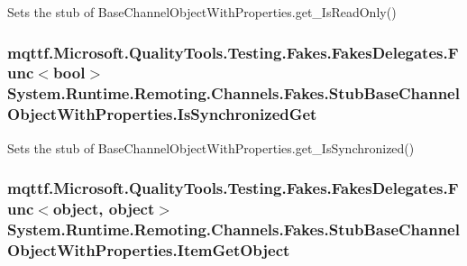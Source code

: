 Sets the stub of Base\-Channel\-Object\-With\-Properties.\-get\-\_\-\-Is\-Read\-Only()

\hypertarget{class_system_1_1_runtime_1_1_remoting_1_1_channels_1_1_fakes_1_1_stub_base_channel_object_with_properties_a45b4804380578cec24c8b7eb50a9d858}{
\subsubsection[{Is\-Synchronized\-Get}]{\setlength{\rightskip}{0pt plus 5cm}mqttf.\-Microsoft.\-Quality\-Tools.\-Testing.\-Fakes.\-Fakes\-Delegates.\-Func$<$bool$>$ System.\-Runtime.\-Remoting.\-Channels.\-Fakes.\-Stub\-Base\-Channel\-Object\-With\-Properties.\-Is\-Synchronized\-Get}}\label{class_system_1_1_runtime_1_1_remoting_1_1_channels_1_1_fakes_1_1_stub_base_channel_object_with_properties_a45b4804380578cec24c8b7eb50a9d858}


Sets the stub of Base\-Channel\-Object\-With\-Properties.\-get\-\_\-\-Is\-Synchronized()

\hypertarget{class_system_1_1_runtime_1_1_remoting_1_1_channels_1_1_fakes_1_1_stub_base_channel_object_with_properties_a8202575b4bab5eac37741c5c308e252a}{
\subsubsection[{Item\-Get\-Object}]{\setlength{\rightskip}{0pt plus 5cm}mqttf.\-Microsoft.\-Quality\-Tools.\-Testing.\-Fakes.\-Fakes\-Delegates.\-Func$<$object, object$>$ System.\-Runtime.\-Remoting.\-Channels.\-Fakes.\-Stub\-Base\-Channel\-Object\-With\-Properties.\-Item\-Get\-Object}}\label{class_system_1_1_runtime_1_1_remoting_1_1_channels_1_1_fakes_1_1_stub_base_channel_object_with_properties_a8202575b4bab5eac37741c5c308e252a}


